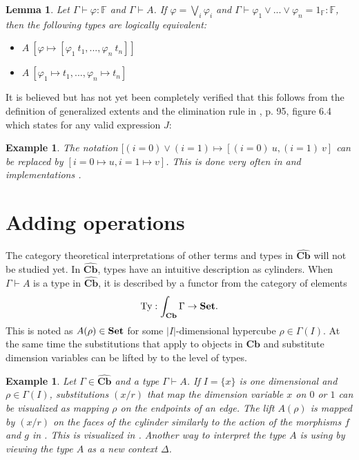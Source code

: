 \documentclass[12pt,a4paper,twoside,xetex]{book} %
\newtheorem{lemma}[theorem]{Lemma}
\newtheorem{example}[theorem]{Example}
\newcommand{\psh}[1]{\widehat{#1}}
\newcommand{\cube}[0]{\textbf{Cb}}
\begin{document}
\begin{lemma}\label{extentrewrite}
Let $\Gamma \vdash \varphi : \mathbb{F}$ and $\Gamma \vdash A$. If $\varphi = 
\bigvee_i \varphi_i$ and $\Gamma \vdash \varphi_1 \vee ... \vee \varphi_n = 
1_{\mathbb{F}} : \mathbb{F}$, then the following types are logically equivalent: 
\begin{itemize}
\item $A\ \left[\varphi \mapsto [\varphi_1 \ t_1, ..., \varphi_n \ t_n] \right]$
\item $A\ [\varphi_1 \mapsto t_1, ..., \varphi_n \mapsto t_n]$
\end{itemize}

\end{lemma}

It is believed but has not yet been completely verified that this follows from the definition of generalized extents and the elimination rule in \cite{Huber2016}, p. 95, figure 6.4 which states for any valid expression $J$: 
\begin{prooftree}
\end{prooftree}


\begin{example}
The notation $[(i = 0) \vee (i=1) \mapsto [(i=0) \ u, (i=1)\  v]$ can 
be replaced by $[i=0 \mapsto u, i=1 \mapsto v]$. This is done very often in 
\cite{Huber2016} and implementations \cite{Moertberg2018}.
\end{example}


\section{Adding operations}\label{extraops}

The category theoretical interpretations of other 
terms and types in $\psh{\cube}$ will not be studied yet. In $\psh{\cube}$, types have an intuitive description as cylinders. When $\Gamma \vdash A$ is a type in $\psh{\cube}$, it is described by a functor from the category of elements 
$$\text{Ty}:\int_{\cube} \Gamma \rightarrow \set.$$ This is noted as $A(\rho) \in \set$ for some $|I|$-dimensional hypercube $\rho 
\in \Gamma (I)$. At the same time the substitutions that apply to objects in $\cube$ and substitute dimension variables can 
be lifted by  to the level of types. 

\begin{example}
Let $\Gamma  \in \psh{\cube}$ and a type $\Gamma \vdash A$. If $I=\{x\}$ is one dimensional and $\rho \in \Gamma(I)$, substitutions $(x/r)$ that 
map the dimension variable $x$ on $0$ or $1$ can be visualized as mapping $\rho$ on the endpoints of an edge. The lift $A(\rho)$ is mapped by $(x/r)$ on the faces of the 
cylinder similarly to the action of the morphisms $f$ and $g$ in . This is visualized in .  Another way to interpret the type $A$ is using  by viewing the type $A$ as a new context $\Delta$.  
\end{example}
\end{document}
